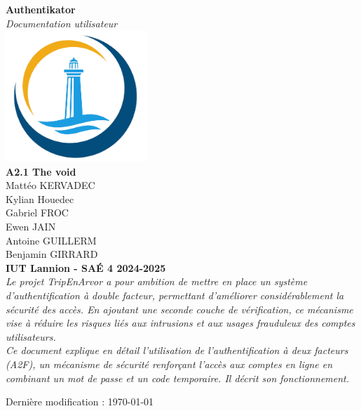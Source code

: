 \documentclass{article}
\begin{document}
\begin{titlepage}
    \begin{center}
        {\Huge\bfseries Authentikator} \\[1cm]
        {\Large\textit{Documentation utilisateur}} \\[2cm]

        \includegraphics[width=0.4\textwidth]{../img/logo.png} \\[2cm]

        {\Large \textbf{A2.1 The void}} \\ [.2cm]
        {\large Mattéo KERVADEC } \\[.2cm]
        {\large Kylian Houedec } \\[.2cm]
        {\large Gabriel FROC } \\[.2cm]
        {\large Ewen JAIN } \\[.2cm]
        {\large Antoine GUILLERM } \\[.2cm]
        {\large Benjamin GIRRARD } \\[1cm]

        \textbf{IUT Lannion - SAÉ 4 2024-2025} \\[1.2cm]

        \textit{
        Le projet TripEnArvor a pour ambition de mettre en place un système d'authentification à double facteur, permettant d'améliorer considérablement la sécurité des accès. En ajoutant une seconde couche de vérification, ce mécanisme vise à réduire les risques liés aux intrusions et aux usages frauduleux des comptes utilisateurs. 
		} \\[0.5cm]
		
		\textit{
        Ce document explique en détail l'utilisation de l'authentification à deux facteurs (A2F), un mécanisme de sécurité renforçant l'accès aux comptes en ligne en combinant un mot de passe et un code temporaire. Il décrit son fonctionnement.
		}

        \vfill  %

        {\small Dernière modification : \today}
    \end{center}
\end{titlepage}
\end{document}
